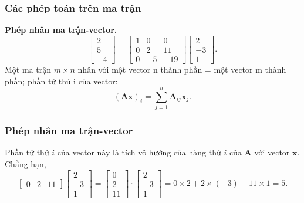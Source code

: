 \begin{frame}
    \frametitle{Các phép toán trên ma trận}
    \textbf{Phép nhân ma trận-vector.}\begin{equation}\label{eq1}
    \begin{bmatrix}
    2\\5\\-4
\end{bmatrix}=\begin{bmatrix}
    1&0&0\\
    0&2&11\\
    0&-5&-19
\end{bmatrix}\begin{bmatrix}
    2\\-3\\1
\end{bmatrix}.\end{equation}
Một ma trận \(m\times n\) nhân với một vector n thành phần = một vector m thành phần; phần tử thú i của vector:
\begin{equation}
    (\mathbf{Ax})_i = \sum_{j=1}^n \mathbf{A}_{ij}\mathbf{x}_j.
\end{equation}
\end{frame}
\begin{frame}
    \frametitle{Phép nhân ma trận-vector}
    Phần tử thứ \(i\) của vector này là tích vô hướng của hàng thứ \(i\) của \(\mathbf{A}\) với vector \(\mathbf{x}\). Chẳng hạn,
    \[\begin{bmatrix}
    0&2&11
\end{bmatrix}\begin{bmatrix}
    2\\-3\\1
\end{bmatrix}=\begin{bmatrix}
    0\\2\\11
\end{bmatrix}\cdot \begin{bmatrix}
    2\\-3\\1
\end{bmatrix}=0\times 2+2\times(-3)+11\times 1 =5.\]
\end{frame}
